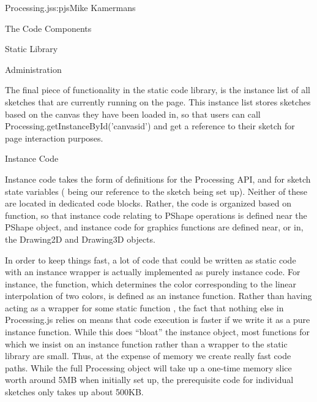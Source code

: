 \begin{aosachapter}{Processing.js}{s:pjs}{Mike Kamermans}
\begin{aosasect1}{The Code Components}
\begin{aosasect2}{Static Library}
\begin{aosaitemize}
\end{aosaitemize}

\end{aosasect2}

\begin{aosasect2}{Administration}

The final piece of functionality in the static code library, is the
instance list of all sketches that are currently running on the
page. This instance list stores sketches based on the canvas they have
been loaded in, so that users can call
Processing.getInstanceById('canvasid') and get a reference to their
sketch for page interaction purposes.

\begin{aosasect3}{Instance Code}

Instance code takes the form of 
definitions for the Processing API, and  for sketch
state variables ( being our reference to the sketch being set
up). Neither of these are located in dedicated code blocks. Rather,
the code is organized based on function, so that instance code
relating to PShape operations is defined near the PShape object, and
instance code for graphics functions are defined near, or in, the
Drawing2D and Drawing3D objects.

In order to keep things fast, a lot of code that could be written as
static code with an instance wrapper is actually implemented as purely
instance code. For instance, the  function,
which determines the color corresponding to the linear interpolation
of two colors, is defined as an instance function. Rather than having
 acting as a wrapper for some static function
, the fact that nothing else in
Processing.js relies on  means that code execution is
faster if we write it as a pure instance function. While this does
``bloat'' the instance object, most functions for which we insist on an
instance function rather than a wrapper to the static library are
small. Thus, at the expense of memory we create really fast code
paths. While the full Processing object will take up a one-time memory
slice worth around 5MB when initially set up, the prerequisite code
for individual sketches only takes up about 500KB.

\end{aosasect3}

\end{aosasect2}


\end{aosasect1}
\end{aosachapter}
